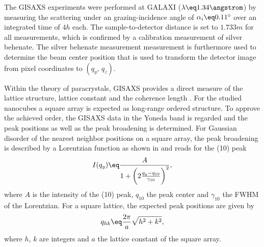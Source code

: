 \documentclass[\main/dresen_thesis.tex]{subfiles}
\begin{document}
      The GISAXS experiments were performed at GALAXI ($\lambda \eq 1.34 \angstrom$) by measuring the scattering under an grazing-incidence angle of $\alpha_i \eq 0.11^\circ$ over an integrated time of $4 \unit{h}$ each.
      The sample-to-detector distance is set to $1.733 \unit{m}$ for all measurements, which is confirmed by a calibration measurement of silver behenate.
      The silver behenate measurement measurement is furthermore used to determine the beam center position that is used to transform the detector image from pixel coordinates to $(q_y,\, q_z)$.

      Within the theory of paracrystals, GISAXS provides a direct measure of the lattice structure, lattice constant and the coherence length \cite{Renaud_2009_Probi}.
      For the studied nanocubes a square array is expected as long-range ordered structure.
      To approve the achieved order, the GISAXS data in the Yoneda band is regarded and the peak positions as well as the peak broadening is determined.
      For Gaussian disorder of the nearest neighbor positions on a square array, the peak broadening is described by a Lorentzian function as shown in  and reads for the (10) peak
      \begin{align}
        I(q_y) \eq \frac{A} {1 + \biggl(2\frac{q_y - q_{10}}{\gamma_{10}}\biggr)^2},
      \end{align}
      where $A$ is the intensity of the (10) peak, $q_{10}$ the peak center and $\gamma_{10}$ the FWHM of the Lorentzian.
      For a square lattice, the expected peak positions are given by
      \begin{align}\label{eq:monolayers:preparation:solventVariation:squareLatticeIndices}
        q_{hk} \eq \frac{2 \pi}{a} \sqrt{h^2 + k^2},
      \end{align}
      where $h$, $k$ are integers and $a$ the lattice constant of the square array.
\end{document}
